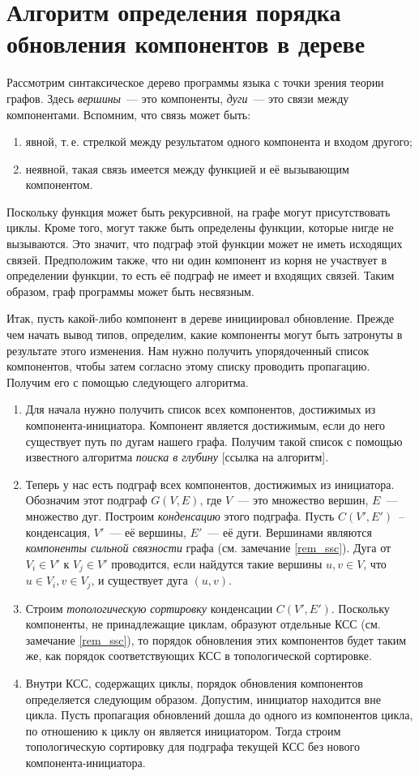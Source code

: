 \section{Алгоритм определения порядка обновления компонентов в дереве}
Рассмотрим синтаксическое дерево программы языка с точки зрения теории графов. Здесь \textit{вершины}~--- это компоненты, \textit{дуги}~--- это связи между компонентами. Вспомним, что связь может быть:
	\begin{enumerate}[1)]
		\item явной, т.\,е. стрелкой между результатом одного компонента и входом другого;
		\item неявной, такая связь имеется между функцией и её вызывающим компонентом.
	\end{enumerate}
Поскольку функция может быть рекурсивной, на графе могут присутствовать циклы. Кроме того, могут также быть определены функции, которые нигде не вызываются. Это значит, что подграф этой функции может не иметь исходящих связей. Предположим также, что ни один компонент из корня не участвует в определении функции, то есть её подграф не имеет и входящих связей. Таким образом, граф программы может быть несвязным.

Итак, пусть какой-либо компонент в дереве инициировал обновление. Прежде чем начать вывод типов, определим, какие компоненты могут быть затронуты в результате этого изменения. Нам нужно получить упорядоченный список компонентов, чтобы затем согласно этому списку проводить пропагацию. Получим его с помощью следующего алгоритма.
\begin{enumerate}
	\item Для начала нужно получить список всех компонентов, достижимых из компонента-инициатора. Компонент является достижимым, если до него существует путь по дугам нашего графа. Получим такой список с помощью известного алгоритма \textit{поиска в глубину} [ссылка на алгоритм].
	\item Теперь у нас есть подграф всех компонентов, достижимых из инициатора. Обозначим этот подграф $G(V, E)$, где $V$~--- это множество вершин, $E$~--- множество дуг. Построим \textit{конденсацию} этого подграфа. Пусть $C(V', E')$~-- конденсация, $V'$~--- её вершины, $E'$~--- её дуги. Вершинами являются \textit{компоненты сильной связности} графа (см. замечание \ref{rem_ssc}). Дуга от $V_i \in V'$ к $V_j \in V'$ проводится, если найдутся такие вершины $u, v \in V$, что $u \in V_i, v \in V_j$, и существует дуга $(u, v)$.
	\item Строим \textit{топологическую сортировку} конденсации $C(V', E')$. Поскольку компоненты, не принадлежащие циклам, образуют отдельные КСС (см. замечание \ref{rem_ssc}), то порядок обновления этих компонентов будет таким же, как порядок соответствующих КСС в топологической сортировке.
	\item Внутри КСС, содержащих циклы, порядок обновления компонентов определяется следующим образом. Допустим, инициатор находится вне цикла. Пусть пропагация обновлений дошла до одного из компонентов цикла, по отношению к циклу он является инициатором. Тогда строим топологическую сортировку для подграфа текущей КСС без нового компонента-инициатора.
\end{enumerate}

